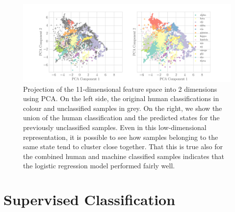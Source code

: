 \documentclass[12pt]{emulateapj}
\begin{document}
%
%

\begin{figure}[htbp]
\begin{center}
\includegraphics[width=\textwidth]{grs1915_supervised_pca_comparison.pdf}
\caption{Projection of the 11-dimensional feature space into 2 dimensions using PCA. On the left side, the original human classifications in colour and 
unclassified samples in grey. On the right, we show the union of the human classification and the predicted states for the previously unclassified samples. 
Even in this low-dimensional representation, it is possible to see how samples belonging to the same state tend to cluster close together. That this is true also 
for the combined human and machine classified samples indicates that the logistic regression model performed fairly well.} 
\label{fig:supervised_pca}
\end{center}
\end{figure}

\section{Supervised Classification}
\label{sec:supervised}
\end{document}
